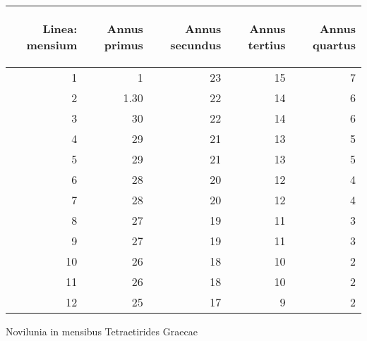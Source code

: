 %
\normalsize
\centering
\begin{tabular}{| r | r | r | r | r |}
\hline
\begin{sideways}
Linea: mensium
\end{sideways}
&
\begin{sideways}
Annus primus
\end{sideways}
&
\begin{sideways}
Annus secundus
\end{sideways}
&
\begin{sideways}
Annus tertius
\end{sideways}
&
\begin{sideways}
Annus quartus
\end{sideways}
\\
\hline
  1 & 1    & 23 & 15 & 7
\\ \cline{2-5}
  2 & 1.30 & 22 & 14 & 6
\\ \cline{2-5}
  3 & 30   & 22 & 14 & 6
\\ \cline{2-5}
  4 & 29   & 21 & 13 & 5
\\ \cline{2-5}
  5 & 29   & 21 & 13 & 5
\\ \cline{2-5}
  6 & 28   & 20 & 12 & 4
\\ \cline{2-5}
  7 & 28   & 20 & 12 & 4
\\ \cline{2-5}
  8 & 27   & 19 & 11 & 3
\\ \cline{2-5}
  9 & 27   & 19 & 11 & 3
\\ \cline{2-5}
 10 & 26   & 18 & 10 & 2
\\ \cline{2-5}
 11 & 26   & 18 & 10 & 2
\\ \cline{2-5}
 12 & 25   & 17 &  9 & 2
\\
\hline
\end{tabular}
%
\caption{Novilunia in mensibus Tetraetirides Graecae}
\label{tab:p027}
%
